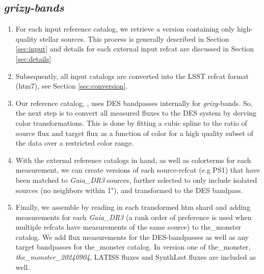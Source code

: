 \subsection{\textit{grizy-bands}}
\begin{enumerate}
    \item For each input reference catalog, we retrieve a version containing only high-quality stellar sources. This process is generally described in Section \ref{sec:input} and details for each external input refcat are discussed in Section \ref{sec:details}
    \item Subsequently, all input catalogs are converted into the LSST refcat format (htm7), see Section \ref{sec:conversion}.
    \item Our reference catalog, \monster, uses DES bandpasses internally for \textit{grizy}-bands. So, the next step is to convert all measured fluxes to the DES system by derving color transformations.
    This is done by fitting a cubic spline to the ratio of source flux and target flux as a function of color for a high quality subset of the data over a restricted color range.
    \item With the external reference catalogs in hand, as well as colorterms for each measurement, we can create versions of each source-refcat (e.g PS1) that have been matched to \textit{Gaia\_DR3} sources, further selected to only include isolated sources (no neighbors within 1"), and transformed to the DES bandpass.
    \item Finally, we assemble \monster by reading in each transformed htm shard and adding measurements for each \textit{Gaia\_DR3} (a rank order of preference is used when multiple refcats have measurements of the same source) to the\_monster catalog. 
    We add flux measurements for the DES-bandpasses as well as any target bandpasses for the\_monster catalog. In version one of the\_monster, \textit{the\_monster\_20240904}, LATISS fluxes and SynthLsst fluxes are included as well.
\end{enumerate}

